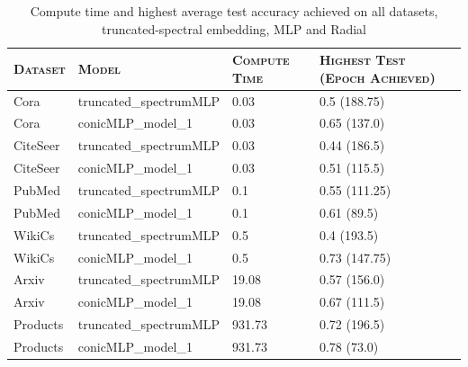 \begin{table}\caption{Compute time and highest average test accuracy achieved on all datasets, truncated-spectral embedding, MLP and Radial}\begin{center}\begin{tabular}{ | m{2cm} | m{2cm}| m{2cm} | m{2cm} }\hline\textsc{Dataset} & \textsc{Model} & \textsc{Compute Time} & \textsc{Highest Test (Epoch Achieved)}\\\hline Cora & truncated_spectrumMLP & 0.03 & 0.5 (188.75)\\\hline Cora & conicMLP_model_1 & 0.03 & 0.65 (137.0)\\\hline CiteSeer & truncated_spectrumMLP & 0.03 & 0.44 (186.5)\\\hline CiteSeer & conicMLP_model_1 & 0.03 & 0.51 (115.5)\\\hline PubMed & truncated_spectrumMLP & 0.1 & 0.55 (111.25)\\\hline PubMed & conicMLP_model_1 & 0.1 & 0.61 (89.5)\\\hline WikiCs & truncated_spectrumMLP & 0.5 & 0.4 (193.5)\\\hline WikiCs & conicMLP_model_1 & 0.5 & 0.73 (147.75)\\\hline Arxiv & truncated_spectrumMLP & 19.08 & 0.57 (156.0)\\\hline Arxiv & conicMLP_model_1 & 19.08 & 0.67 (111.5)\\\hline Products & truncated_spectrumMLP & 931.73 & 0.72 (196.5)\\\hline Products & conicMLP_model_1 & 931.73 & 0.78 (73.0)\\\hline\end{tabular}\end{center}\end{table}
